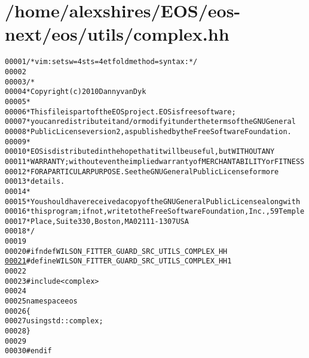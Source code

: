 \hypertarget{complex_8hh_source}{
\section{/home/alexshires/EOS/eos-\/next/eos/utils/complex.hh}
}


\begin{footnotesize}\begin{alltt}
00001 \textcolor{comment}{/* vim: set sw=4 sts=4 et foldmethod=syntax : */}
00002 
00003 \textcolor{comment}{/*}
00004 \textcolor{comment}{ * Copyright (c) 2010 Danny van Dyk}
00005 \textcolor{comment}{ *}
00006 \textcolor{comment}{ * This file is part of the EOS project. EOS is free software;}
00007 \textcolor{comment}{ * you can redistribute it and/or modify it under the terms of the GNU General}
00008 \textcolor{comment}{ * Public License version 2, as published by the Free Software Foundation.}
00009 \textcolor{comment}{ *}
00010 \textcolor{comment}{ * EOS is distributed in the hope that it will be useful, but WITHOUT ANY}
00011 \textcolor{comment}{ * WARRANTY; without even the implied warranty of MERCHANTABILITY or FITNESS}
00012 \textcolor{comment}{ * FOR A PARTICULAR PURPOSE.  See the GNU General Public License for more}
00013 \textcolor{comment}{ * details.}
00014 \textcolor{comment}{ *}
00015 \textcolor{comment}{ * You should have received a copy of the GNU General Public License along with}
00016 \textcolor{comment}{ * this program; if not, write to the Free Software Foundation, Inc., 59 Temple}
00017 \textcolor{comment}{ * Place, Suite 330, Boston, MA  02111-1307  USA}
00018 \textcolor{comment}{ */}
00019 
00020 \textcolor{preprocessor}{#ifndef WILSON\_FITTER\_GUARD\_SRC\_UTILS\_COMPLEX\_HH}
\hypertarget{complex_8hh_source_l00021}{}\hyperlink{complex_8hh_a2fe09ac643d095558e312629b20b0830}{00021} \textcolor{preprocessor}{}\textcolor{preprocessor}{#define WILSON\_FITTER\_GUARD\_SRC\_UTILS\_COMPLEX\_HH 1}
00022 \textcolor{preprocessor}{}
00023 \textcolor{preprocessor}{#include <complex>}
00024 
00025 \textcolor{keyword}{namespace }eos
00026 \{
00027     \textcolor{keyword}{using} std::complex;
00028 \}
00029 
00030 \textcolor{preprocessor}{#endif}
\end{alltt}\end{footnotesize}
